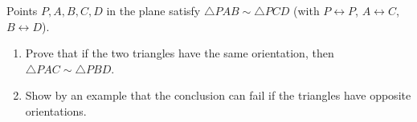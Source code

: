 Points $P,A,B,C,D$ in the plane satisfy $\triangle PAB\sim\triangle PCD$ (with $P\leftrightarrow P$, $A\leftrightarrow C$, $B\leftrightarrow D$).
\begin{enumerate}
\item[(a)] Prove that if the two triangles have the same orientation, then $\triangle PAC\sim\triangle PBD$.
\item[(b)] Show by an example that the conclusion can fail if the triangles have opposite orientations.
\end{enumerate}

